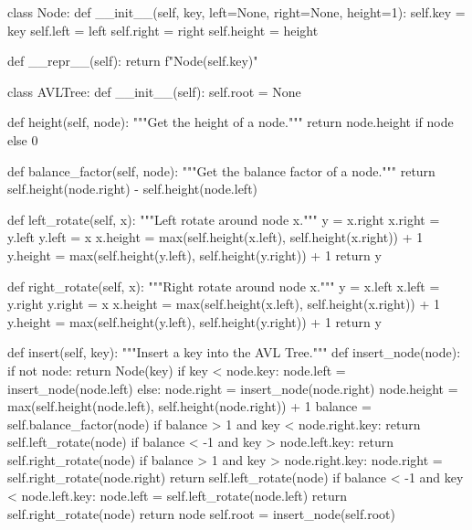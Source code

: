 class Node:
    def __init__(self, key, left=None, right=None, height=1):
        self.key = key
        self.left = left
        self.right = right
        self.height = height
    
    def __repr__(self):
        return f"Node({self.key})"

class AVLTree:
    def __init__(self):
        self.root = None

    def height(self, node):
        """Get the height of a node."""
        return node.height if node else 0

    def balance_factor(self, node):
        """Get the balance factor of a node."""
        return self.height(node.right) - self.height(node.left)

    def left_rotate(self, x):
        """Left rotate around node x."""
        y = x.right
        x.right = y.left
        y.left = x
        x.height = max(self.height(x.left), self.height(x.right)) + 1
        y.height = max(self.height(y.left), self.height(y.right)) + 1
        return y

    def right_rotate(self, x):
        """Right rotate around node x."""
        y = x.left
        x.left = y.right
        y.right = x
        x.height = max(self.height(x.left), self.height(x.right)) + 1
        y.height = max(self.height(y.left), self.height(y.right)) + 1
        return y

    def insert(self, key):
        """Insert a key into the AVL Tree."""
        def insert_node(node):
            if not node:
                return Node(key)
            if key < node.key:
                node.left = insert_node(node.left)
            else:
                node.right = insert_node(node.right)
            node.height = max(self.height(node.left), self.height(node.right)) + 1
            balance = self.balance_factor(node)
            if balance > 1 and key < node.right.key:
                return self.left_rotate(node)
            if balance < -1 and key > node.left.key:
                return self.right_rotate(node)
            if balance > 1 and key > node.right.key:
                node.right = self.right_rotate(node.right)
                return self.left_rotate(node)
            if balance < -1 and key < node.left.key:
                node.left = self.left_rotate(node.left)
                return self.right_rotate(node)
            return node
        self.root = insert_node(self.root)
